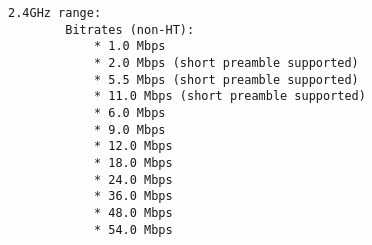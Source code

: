 \begin{lstlisting}
2.4GHz range:
		Bitrates (non-HT):
			* 1.0 Mbps
			* 2.0 Mbps (short preamble supported)
			* 5.5 Mbps (short preamble supported)
			* 11.0 Mbps (short preamble supported)
			* 6.0 Mbps
			* 9.0 Mbps
			* 12.0 Mbps
			* 18.0 Mbps
			* 24.0 Mbps
			* 36.0 Mbps
			* 48.0 Mbps
			* 54.0 Mbps
\end{lstlisting}
